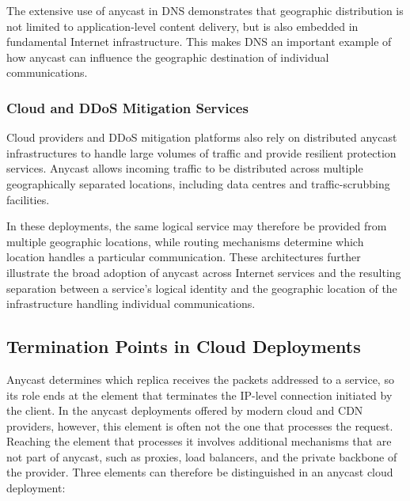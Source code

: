 The extensive use of anycast in DNS demonstrates that geographic distribution is not limited to application-level content delivery, but is also embedded in fundamental Internet infrastructure. This makes DNS an important example of how anycast can influence the geographic destination of individual communications.

\subsubsection{Cloud and DDoS Mitigation Services}
\label{sc:background_internet_routing_anycast_modern_ddos}

Cloud providers and DDoS mitigation platforms also rely on distributed anycast infrastructures to handle large volumes of traffic and provide resilient protection services. Anycast allows incoming traffic to be distributed across multiple geographically separated locations, including data centres and traffic-scrubbing facilities.

In these deployments, the same logical service may therefore be provided from multiple geographic locations, while routing mechanisms determine which location handles a particular communication. These architectures further illustrate the broad adoption of anycast across Internet services and the resulting separation between a service's logical identity and the geographic location of the infrastructure handling individual communications.

\subsection{Termination Points in Cloud Deployments}
\label{sc:background_anycast_scenarios}

Anycast determines which replica receives the packets addressed to a service, so its role ends at the element that terminates the IP-level connection initiated by the client. In the anycast deployments offered by modern cloud and CDN providers, however, this element is often not the one that processes the request. Reaching the element that processes it involves additional mechanisms that are not part of anycast, such as proxies, load balancers, and the private backbone of the provider. Three elements can therefore be distinguished in an anycast cloud deployment:


